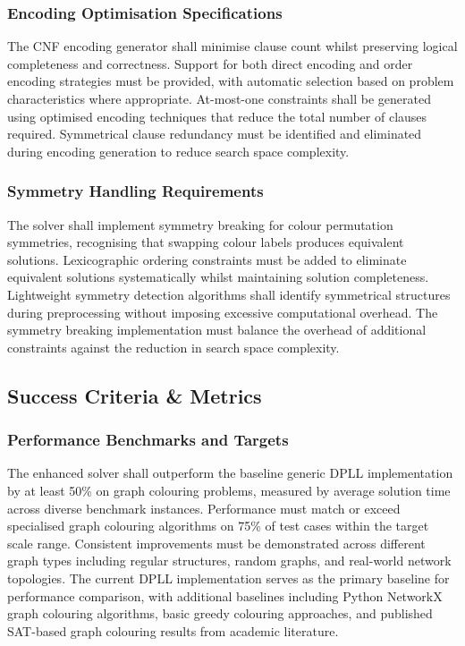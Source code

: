 \subsubsection{Encoding Optimisation Specifications}
The CNF encoding generator shall minimise clause count whilst preserving logical completeness and correctness. Support for both direct encoding and order encoding strategies must be provided, with automatic selection based on problem characteristics where appropriate. At-most-one constraints shall be generated using optimised encoding techniques that reduce the total number of clauses required. Symmetrical clause redundancy must be identified and eliminated during encoding generation to reduce search space complexity.

\subsubsection{Symmetry Handling Requirements}
The solver shall implement symmetry breaking for colour permutation symmetries, recognising that swapping colour labels produces equivalent solutions. Lexicographic ordering constraints must be added to eliminate equivalent solutions systematically whilst maintaining solution completeness. Lightweight symmetry detection algorithms shall identify symmetrical structures during preprocessing without imposing excessive computational overhead. The symmetry breaking implementation must balance the overhead of additional constraints against the reduction in search space complexity.

\subsection{Success Criteria \& Metrics}

\subsubsection{Performance Benchmarks and Targets}
The enhanced solver shall outperform the baseline generic DPLL implementation by at least 50\% on graph colouring problems, measured by average solution time across diverse benchmark instances. Performance must match or exceed specialised graph colouring algorithms on 75\% of test cases within the target scale range. Consistent improvements must be demonstrated across different graph types including regular structures, random graphs, and real-world network topologies. The current DPLL implementation serves as the primary baseline for performance comparison, with additional baselines including Python NetworkX graph colouring algorithms, basic greedy colouring approaches, and published SAT-based graph colouring results from academic literature.

